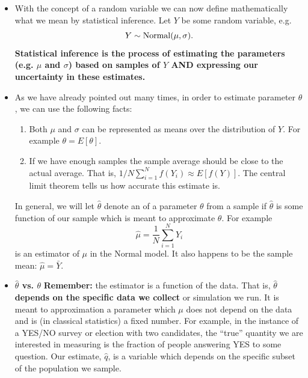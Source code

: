 \begin{itemize}
\item With the concept of a random variable we can now define mathematically what we mean by statistical inference. Let $Y$ be some random variable, e.g. 
\begin{equation*}
Y \sim {\rm Normal}(\mu,\sigma). 
\end{equation*}
{\bf Statistical inference is the process of estimating the parameters (e.g. $\mu$ and $\sigma$) based on samples of $Y$ AND expressing our uncertainty in these estimates.}
\item As we have already pointed out many times, in order to estimate parameter $\theta$, we can use the following facts: 
\begin{enumerate}
\item Both $\mu$ and $\sigma$ can be represented as means over the distribution of $Y$. For example $\theta = E[\theta]$. 
\item If we have enough samples the sample average should be close to the actual average.  That is, $1/N\sum_{i=1}^Nf(Y_i) \approx E[f(Y)]$. The central limit theorem tells us how accurate this estimate is. 
\end{enumerate}
In general, we will let $\hat{\theta}$ denote an  of a parameter $\theta$ from a sample if $\hat{\theta}$ is some function of our sample which is meant to approximate $\theta$.  For example 
\begin{equation*}\label{eq:muhat}
\hat{\mu} = \frac{1}{N}\sum_{i=1}^N Y_i
\end{equation*}
is an estimator of $\mu$ in the Normal model. It also happens to be the sample mean: $\hat{\mu} = \bar{Y}$. 

\item {\bf $\hat{\theta}$ vs. $\theta$}
{\bf Remember:} the estimator is a function of the data. That is, {\bf $\hat{\theta}$ depends on the specific data we collect} or simulation we run. It is meant to approximation a parameter which $\mu$ does not depend on the data and is (in classical statistics) a fixed number. For example,  in the instance of a YES/NO survey or election with two candidates, the ``true'' quantity we are interested in measuring is the fraction of people answering YES to some question. Our estimate, $\hat{q}$, is a variable which depends on the specific subset of the population we sample. 
\end{itemize}


